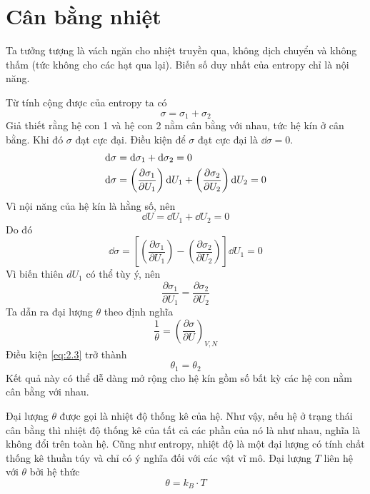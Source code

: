 \section{Cân bằng nhiệt}
	Ta tưởng tượng là vách ngăn cho nhiệt truyền qua, không dịch chuyển và không thấm (tức không cho các hạt qua lại). Biến số duy nhất của entropy chỉ là nội năng.
	
	Từ tính cộng được của entropy ta có
	\begin{equation*}
		\sigma = \sigma_1 + \sigma_2
	\end{equation*}
	Giả thiết rằng hệ con 1 và hệ con 2 nằm cân bằng với nhau, tức hệ kín ở cân bằng. Khi đó $ \sigma $ đạt cực đại. Điều kiện để $ \sigma $ đạt cực đại là $ \dd{\sigma} = 0 $.
	\begin{align}
		\mathrm{d}\sigma & = \mathrm{d}\sigma_1 + \mathrm{d}\sigma_2 = 0 \notag \\
		\mathrm{d}\sigma & = \left(\dfrac{\partial \sigma_1}{\partial U_1}\right) \mathrm{d}U_1 + \left(\dfrac{\partial \sigma_2}{\partial U_2}\right) \mathrm{d}U_2 = 0
	\end{align}
	Vì nội năng của hệ kín là hằng số, nên
	\begin{equation*}
		\dd{U} = \dd{U_1} + \dd{U_2} = 0
	\end{equation*}
	Do đó
	\begin{equation*}
		\dd{\sigma} = \left[\left(\dfrac{\partial \sigma_1}{\partial U_1}\right) - \left(\dfrac{\partial \sigma_2}{\partial U_2}\right)\right] \dd{U_1} = 0
	\end{equation*}
	Vì biến thiên $ dU_1 $ có thể tùy ý, nên
	\begin{equation}\label{eq:2.3}
		\dfrac{\partial \sigma_1}{\partial U_1} = \dfrac{\partial \sigma_2}{\partial U_2}
	\end{equation}
	Ta dẫn ra đại lượng $ \theta $ theo định nghĩa
	\begin{equation}\label{eq:2.4}
		\dfrac{1}{\theta} = \left(\dfrac{\partial \sigma}{\partial U}\right)_{V, N}
	\end{equation}
	Điều kiện \eqref{eq:2.3} trở thành
	\begin{equation}\label{eq:2.5}
		\theta_1 = \theta_2
	\end{equation}
	Kết quả này có thể dễ dàng mở rộng cho hệ kín gồm số bất kỳ các hệ con nằm cân bằng với nhau.
	
	Đại lượng $ \theta $ được gọi là nhiệt độ thống kê của hệ. Như vậy, nếu hệ ở trạng thái cân bằng thì nhiệt độ thống kê của tất cả các phần của nó là như nhau, nghĩa là không đổi trên toàn hệ. Cũng như entropy, nhiệt độ là một đại lượng có tính chất thống kê thuần túy và chỉ có ý nghĩa đối với các vật vĩ mô. Đại lượng $ T $ liên hệ với $ \theta $ bởi hệ thức
	\begin{equation}\label{eq:2.6}
		\theta = k_B \cdot T
	\end{equation}